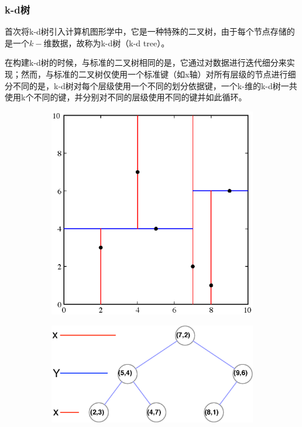 \subsubsection{k-d树}
\cite{a:MultidimensionalBinarySearchTreesUsedforAssociativeSearching}首次将k-d树引入计算机图形学中，它是一种特殊的二叉树，由于每个节点存储的是一个$k-$维数据，故称为k-d树（k-d tree）。

在构建k-d树的时候，与标准的二叉树相同的是，它通过对数据进行迭代细分来实现；然而，与标准的二叉树仅使用一个标准键（如x轴）对所有层级的节点进行细分不同的是，k-d树对每个层级使用一个不同的划分依据键，一个k-维的k-d树一共使用k个不同的键，并分别对不同的层级使用不同的键并如此循环。

\begin{figure}
\begin{center}
	\begin{subfigure}[b]{.49\textwidth}
		\includegraphics[width=1.0\textwidth]{figures/pm/k-d-tree-1}
		\caption{}
	\end{subfigure}
	\begin{subfigure}[b]{.49\textwidth}
		\includegraphics[width=1.0\textwidth]{figures/pm/k-d-tree-2}

\end{subfigure}
\end{center}
\end{figure}
